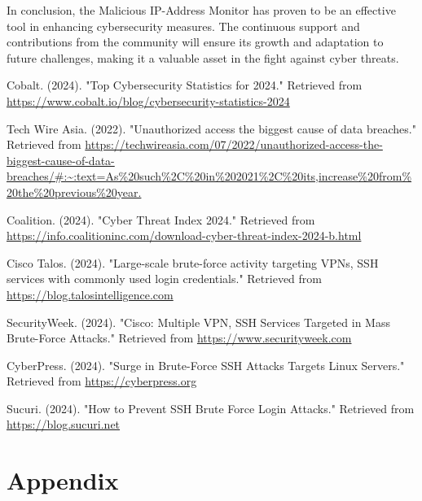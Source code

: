 \documentclass{article}
\begin{document}
    \noindent In conclusion, the Malicious IP-Address Monitor has proven to be an effective tool in enhancing cybersecurity measures.
    The continuous support and contributions from the community will ensure its growth and adaptation to future challenges, making it a valuable asset in the fight against cyber threats.



    \newpage
    \begin{thebibliography}{9}

        Cobalt. (2024). "Top Cybersecurity Statistics for 2024." Retrieved from \url{https://www.cobalt.io/blog/cybersecurity-statistics-2024}

        Tech Wire Asia. (2022). "Unauthorized access the biggest cause of data breaches." Retrieved from \url{https://techwireasia.com/07/2022/unauthorized-access-the-biggest-cause-of-data-breaches/#:~:text=As%20such%2C%20in%202021%2C%20its,increase%20from%20the%20previous%20year.}

        Coalition. (2024). "Cyber Threat Index 2024." Retrieved from \url{https://info.coalitioninc.com/download-cyber-threat-index-2024-b.html}

        Cisco Talos. (2024). "Large-scale brute-force activity targeting VPNs, SSH services with commonly used login credentials." Retrieved from \url{https://blog.talosintelligence.com}

        SecurityWeek. (2024). "Cisco: Multiple VPN, SSH Services Targeted in Mass Brute-Force Attacks." Retrieved from \url{https://www.securityweek.com}

        CyberPress. (2024). "Surge in Brute-Force SSH Attacks Targets Linux Servers." Retrieved from \url{https://cyberpress.org}

        Sucuri. (2024). "How to Prevent SSH Brute Force Login Attacks." Retrieved from \url{https://blog.sucuri.net}

    \end{thebibliography}


    \appendix


    \newpage
    \section{Appendix}\label{sec:appendix}
\end{document}
